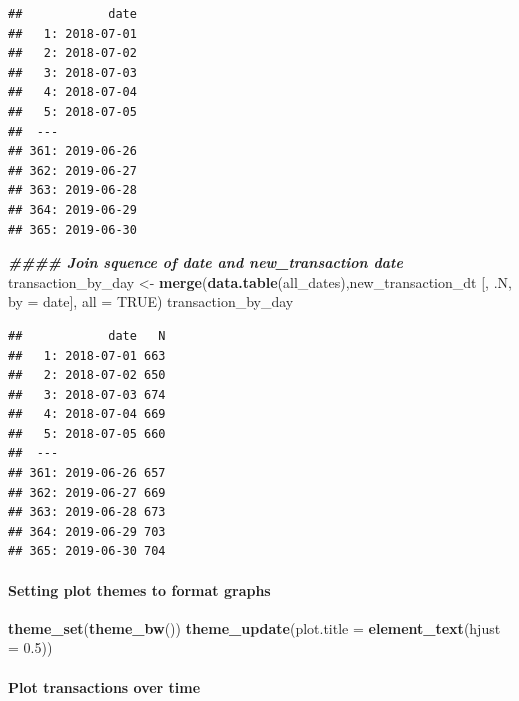 \documentclass[
]{article}
\newenvironment{Shaded}{\begin{snugshade}}{\end{snugshade}}
\newcommand{\AttributeTok}[1]{\textcolor[rgb]{0.13,0.29,0.53}{#1}}
\newcommand{\ConstantTok}[1]{\textcolor[rgb]{0.56,0.35,0.01}{#1}}
\newcommand{\DocumentationTok}[1]{\textcolor[rgb]{0.56,0.35,0.01}{\textbf{\textit{#1}}}}
\newcommand{\FloatTok}[1]{\textcolor[rgb]{0.00,0.00,0.81}{#1}}
\newcommand{\FunctionTok}[1]{\textcolor[rgb]{0.13,0.29,0.53}{\textbf{#1}}}
\newcommand{\NormalTok}[1]{#1}
\newcommand{\OtherTok}[1]{\textcolor[rgb]{0.56,0.35,0.01}{#1}}
\begin{document}
\begin{verbatim}
##            date
##   1: 2018-07-01
##   2: 2018-07-02
##   3: 2018-07-03
##   4: 2018-07-04
##   5: 2018-07-05
##  ---           
## 361: 2019-06-26
## 362: 2019-06-27
## 363: 2019-06-28
## 364: 2019-06-29
## 365: 2019-06-30
\end{verbatim}

\begin{Shaded}
\begin{Highlighting}[]
\DocumentationTok{\#\#\#\# Join squence of date and new\_transaction date}
\NormalTok{transaction\_by\_day }\OtherTok{\textless{}{-}} \FunctionTok{merge}\NormalTok{(}\FunctionTok{data.table}\NormalTok{(all\_dates),new\_transaction\_dt [, .N, }\AttributeTok{by =}\NormalTok{ date], }\AttributeTok{all =} \ConstantTok{TRUE}\NormalTok{)}
\NormalTok{transaction\_by\_day}
\end{Highlighting}
\end{Shaded}

\begin{verbatim}
##            date   N
##   1: 2018-07-01 663
##   2: 2018-07-02 650
##   3: 2018-07-03 674
##   4: 2018-07-04 669
##   5: 2018-07-05 660
##  ---               
## 361: 2019-06-26 657
## 362: 2019-06-27 669
## 363: 2019-06-28 673
## 364: 2019-06-29 703
## 365: 2019-06-30 704
\end{verbatim}

\hypertarget{setting-plot-themes-to-format-graphs}{%
\paragraph{Setting plot themes to format
graphs}\label{setting-plot-themes-to-format-graphs}}

\begin{Shaded}
\begin{Highlighting}[]
\FunctionTok{theme\_set}\NormalTok{(}\FunctionTok{theme\_bw}\NormalTok{())}
\FunctionTok{theme\_update}\NormalTok{(}\AttributeTok{plot.title =} \FunctionTok{element\_text}\NormalTok{(}\AttributeTok{hjust =} \FloatTok{0.5}\NormalTok{))}
\end{Highlighting}
\end{Shaded}

\hypertarget{plot-transactions-over-time}{%
\paragraph{Plot transactions over
time}\label{plot-transactions-over-time}}
\end{document}

